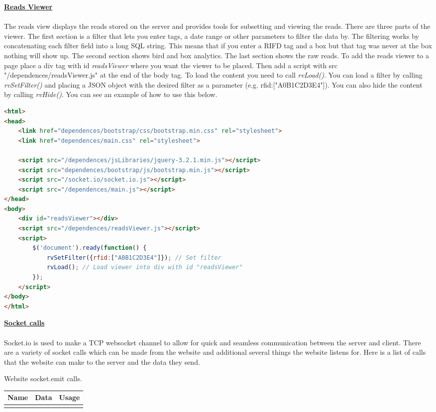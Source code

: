 \documentclass[12pt]{article}
\begin{document}
\underline{\textbf{Reads Viewer}}\\\\
The reads view displays the reads stored on the server and provides tools for subsetting and viewing the reads.  There are three parts of the viewer.  The first section is a filter that lets you enter tags, a date range or other parameters to filter the data by.  The filtering works by concatenating each filter field into a long SQL string.  This means that if you enter a RIFD tag and a box but that tag was never at the box nothing will show up.  The second section shows bird and box analytics.  The last section shows the raw reads.  To add the reads viewer to a page place a div tag with id \textit{readsViewer} where you want the viewer to be placed.  Then add a script with src "/dependences/readsViewer.js" at the end of the body tag.  To load the content you need to call \textit{rvLoad()}.  You can load a filter by calling \textit{rvSetFilter({})} and placing a JSON object with the desired filter as a parameter (e.g. {rfid:["A0B1C2D3E4"]}).  You can also hide the content by calling \textit{rvHide()}.  You can see an example of how to use this below.

\begin{lstlisting}[language=html, caption="Reads viewer", breaklines=true]
<html>
<head>
	<link href="dependences/bootstrap/css/bootstrap.min.css" rel="stylesheet">
	<link href="dependences/main.css" rel="stylesheet">
	
	<script src="/dependences/jsLibraries/jquery-3.2.1.min.js"></script>
	<script src="dependences/bootstrap/js/bootstrap.min.js"></script>
	<script src="/socket.io/socket.io.js"></script>
	<script src="/dependences/main.js"></script>
</head>
<body>
	<div id="readsViewer"></div>
	<script src="/dependences/readsViewer.js"></script>
	<script>
		$('document').ready(function() {
			rvSetFilter({rfid:["A0B1C2D3E4"]}); // Set filter
			rvLoad(); // Load viewer into div with id "readsViewer"
		});
	</script>
</body>
</html>
\end{lstlisting}


\underline{\textbf{Socket calls}}\\\\
Socket.io is used to make a TCP websocket channel to allow for quick and seamless communication between the server and client.  There are a variety of socket calls which can be made from the website and additional several things the website listens for.  Here is a list of calls that the website can make to the server and the data they send.
\begin{center}
	Website socket.emit calls.
	\begin{tabularx}{\textwidth}{ |X|X|X| }
		\hline
		\textbf{Name} & \textbf{Data} & \textbf{Usage}\\ 
		\hline
		&  & \\ 
		\hline
		
		
		
	\end{tabularx}
\end{center}
\end{document}
